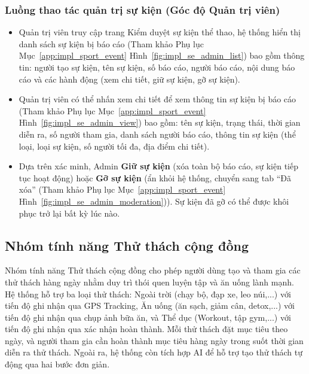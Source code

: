 \subsubsection{Luồng thao tác quản trị sự kiện (Góc độ Quản trị viên)}
\begin{itemize}
    \item Quản trị viên truy cập trang Kiểm duyệt sự kiện thể thao, hệ thống hiển thị danh sách sự kiện bị báo cáo (Tham khảo Phụ lục Mục~\ref{app:impl_sport_event} Hình~\ref{fig:impl_se_admin_list}) bao gồm thông tin: người tạo sự kiện, tên sự kiện, số báo cáo, người báo cáo, nội dung báo cáo và các hành động (xem chi tiết, giữ sự kiện, gỡ sự kiện).


    \item Quản trị viên có thể nhấn xem chi tiết để xem thông tin sự kiện bị báo cáo (Tham khảo Phụ lục Mục~\ref{app:impl_sport_event} Hình~\ref{fig:impl_se_admin_view}) bao gồm: tên sự kiện, trạng thái, thời gian diễn ra, số người tham gia, danh sách người báo cáo, thông tin sự kiện (thể loại, loại sự kiện, số người tối đa, địa điểm chi tiết).


    \item Dựa trên xác minh, Admin \textbf{Giữ sự kiện} (xóa toàn bộ báo cáo, sự kiện tiếp tục hoạt động) hoặc \textbf{Gỡ sự kiện} (ẩn khỏi hệ thống, chuyển sang tab ``Đã xóa'' (Tham khảo Phụ lục Mục~\ref{app:impl_sport_event} Hình~\ref{fig:impl_se_admin_moderation})). Sự kiện đã gỡ có thể được khôi phục trở lại bất kỳ lúc nào.

\end{itemize}

\subsection{Nhóm tính năng Thử thách cộng đồng}
\label{subsec:impl_challenge}

Nhóm tính năng Thử thách cộng đồng cho phép người dùng tạo và tham gia các thử thách hàng ngày nhằm duy trì thói quen luyện tập và ăn uống lành mạnh. Hệ thống hỗ trợ ba loại thử thách: Ngoài trời (chạy bộ, đạp xe, leo núi,...) với tiến độ ghi nhận qua GPS Tracking, Ăn uống (ăn sạch, giảm cân, detox,...) với tiến độ ghi nhận qua chụp ảnh bữa ăn, và Thể dục (Workout, tập gym,...) với tiến độ ghi nhận qua xác nhận hoàn thành. Mỗi thử thách đặt mục tiêu theo ngày, và người tham gia cần hoàn thành mục tiêu hàng ngày trong suốt thời gian diễn ra thử thách. Ngoài ra, hệ thống còn tích hợp AI để hỗ trợ tạo thử thách tự động qua hai bước đơn giản.

